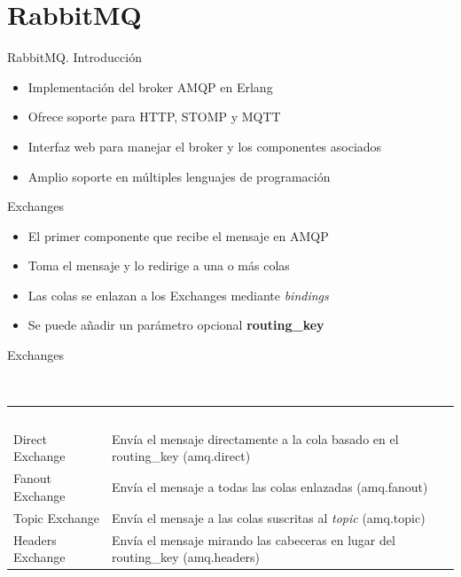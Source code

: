 \documentclass{beamer}
\begin{document}
  \section{RabbitMQ}
  \begin{frame}{RabbitMQ. Introducción}
    \begin{itemize}
      \item Implementación del broker AMQP en Erlang
      \item Ofrece soporte para HTTP, STOMP y MQTT
      \item Interfaz web para manejar el broker y los componentes asociados
      \item Amplio soporte en múltiples lenguajes de programación
    \end{itemize}
  \end{frame}

  \begin{frame}{Exchanges}
    \begin{itemize}
      \item El primer componente que recibe el mensaje en AMQP
      \item Toma el mensaje y lo redirige a una o más colas
      \item Las colas se enlazan a los Exchanges mediante \textit{bindings}
      \item Se puede añadir un parámetro opcional \textbf{routing\_key}
    \end{itemize}
  \end{frame}

  \begin{frame}{Exchanges}
    \begin{block}{~\vspace{0.7cm}}
      \begin{center}
      \vspace{-0.65cm}
      \begin{tabular}{p{}|p{}}
        \textcolor{white}{\bf Tipo} & \textcolor{white}{\bf Descripción} \\
          Direct Exchange &  Envía el mensaje directamente a la cola basado en el routing\_key (amq.direct)\\ \hline
          Fanout Exchange &  Envía el mensaje a todas las colas enlazadas (amq.fanout) \\ \hline
          Topic Exchange &  Envía el mensaje a las colas suscritas al \textit{topic} (amq.topic)\\ \hline
          Headers Exchange & Envía el mensaje mirando las cabeceras en lugar del routing\_key (amq.headers)  \\
      \end{tabular}
      \end{center}
    \end{block}
  \end{frame}
\end{document}
